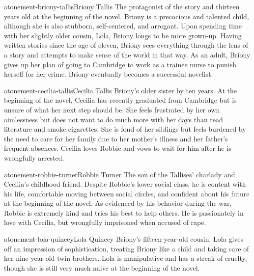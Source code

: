 \documentclass[preview]{standalone}
\begin{document}
\genpage

\begin{snippetcharacter}{atonement-briony-tallis}{Briony Tallis}
    The protagonist of the story and thirteen years old at the beginning of the novel. Briony is a precocious and talented child, although she is also stubborn, self-centered, and arrogant. Upon spending time with her slightly older cousin, Lola, Briony longs to be more grown-up. Having written stories since the age of eleven, Briony sees everything through the lens of a story and attempts to make sense of the world in that way. As an adult, Briony gives up her plan of going to Cambridge to work as a trainee nurse to punish herself for her crime. Briony eventually becomes a successful novelist.
\end{snippetcharacter}

\begin{snippetcharacter}{atonement-cecilia-tallis}{Cecilia Tallis}
    Briony's older sister by ten years. At the beginning of the novel, Cecilia has recently graduated from Cambridge but is unsure of what her next step should be. She feels frustrated by her own aimlessness but does not want to do much more with her days than read literature and smoke cigarettes. She is fond of her siblings but feels burdened by the need to care for her family due to her mother's illness and her father's frequent absences. Cecilia loves Robbie and vows to wait for him after he is wrongfully arrested.
\end{snippetcharacter}

\begin{snippetcharacter}{atonement-robbie-turner}{Robbie Turner}
    The son of the Tallises' charlady and Cecilia's childhood friend. Despite Robbie's lower social class, he is content with his life, comfortable moving between social circles, and confident about his future at the beginning of the novel. As evidenced by his behavior during the war, Robbie is extremely kind and tries his best to help others. He is passionately in love with Cecilia, but wrongfully imprisoned when accused of rape.
\end{snippetcharacter}

\begin{snippetcharacter}{atonement-lola-quincey}{Lola Quincey}
    Briony's fifteen-year-old cousin. Lola gives off an impression of sophistication, treating Briony like a child and taking care of her nine-year-old twin brothers. Lola is manipulative and has a streak of cruelty, though she is still very much naive at the beginning of the novel.
\end{snippetcharacter}
\end{document}
